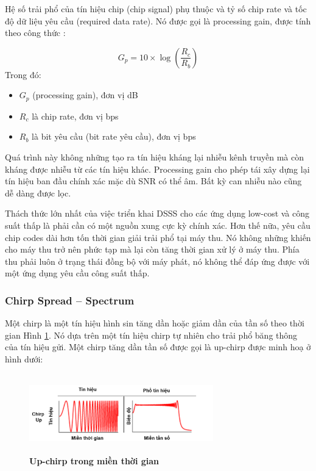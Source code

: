 \documentclass{article} %
\begin{document}
	\newpage
	Hệ số trải phổ của tín hiệu chip (chip signal) phụ thuộc và tỷ số chip rate và tốc độ dữ liệu yêu cầu (required data rate). Nó được gọi là processing gain, được tính theo công thức \cite{semtech2015an1200}:
	
	\begin{equation}\label{processing_gain}
		G_p=10 \times \log \left(\frac{R_c}{R_b}\right)
	\end{equation}
	Trong đó:
	\begin{itemize}
		\item  $G_p$  (processing gain), đơn vị dB
		\item  $R_c$ là chip rate, đơn vị bps
		\item  $R_b$ là bit yêu cầu (bit rate yêu cầu), đơn vị bps
	\end{itemize}
	
	
	Quá trình này không những tạo ra tín hiệu kháng lại nhiễu kênh truyền mà còn kháng được nhiễu từ các tín hiệu khác. Processing gain cho phép tái xây dựng lại tín hiệu ban đầu chính xác mặc dù SNR có thể âm. Bất kỳ can nhiễu nào cũng dễ dàng được lọc. 
	
	Thách thức lớn nhất của việc triển khai DSSS cho các ứng dụng low-cost và công suất thấp là phải cần có một nguồn xung cực kỳ chính xác. Hơn thế nữa, yêu cầu chip codes dài hơn tốn thời gian giải trải phổ tại máy thu. Nó không những khiến cho máy thu trở nên phức tạp mà lại còn tăng thời gian xử lý ở máy thu. Phía thu phải luôn ở trạng thái đồng bộ với máy phát, nó không thể đáp ứng được với một ứng dụng yêu cầu công suất thấp.
	
	
	\subsubsection{Chirp Spread – Spectrum}
	
	Một chirp là một tín hiệu hình sin tăng dần hoặc giảm dần của tần số theo thời gian Hình \ref{UP_chirp}. Nó dựa trên một tín hiệu chirp tự nhiên cho trải phổ băng thông của tín hiệu gửi. Một chirp tăng dần tần số được gọi là up-chirp được minh hoạ ở hình dưới:
	
	\begin{figure}[!ht]
		\centering
		\includegraphics[width=8cm,height=3.4cm]{Images/Up_chirp.png}
		\caption[Up-chirp trong miền thời gian \cite{zhang2019spread}]{\bfseries \fontsize{12pt}{0pt}\selectfont Up-chirp trong miền thời gian \cite{zhang2019spread}}
		\label{UP_chirp}
	\end{figure}
	
\end{document}
